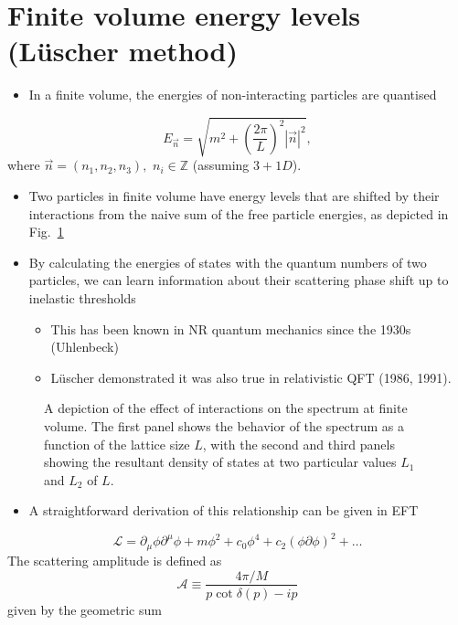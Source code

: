 \section{Finite volume energy levels (Lüscher method)}
\begin{itemize}
    \item In a finite volume, the energies of non-interacting particles are quantised
\end{itemize}
\begin{equation}
    E_{\vec{n}} = \sqrt{m^2 + \left(\frac{2 \pi}{L}\right)^2|\vec{n}|^2},
\end{equation}
where $\vec{n} = (n_1, n_2, n_3),$ $n_i \in \mathbb{Z}$ (assuming $3+1D$).
\begin{itemize}
    \item Two particles in finite volume have energy levels that are shifted by their interactions from the naive sum of the free particle energies, as depicted in Fig.~\ref{fig:int_spec}
    \item By calculating the energies of states with the quantum numbers of two particles, we can learn information about their scattering phase shift up to inelastic thresholds
    \begin{itemize}
        \item This has been known in NR quantum mechanics since the 1930s (Uhlenbeck)
        \item L\"uscher demonstrated it was also true in relativistic QFT (1986, 1991).
    \end{itemize}
\end{itemize}
\begin{figure}
\begin{subfigure}{0.3\textwidth}
\end{subfigure}
\begin{subfigure}{0.3\textwidth}
\end{subfigure}
\begin{subfigure}{0.3\textwidth}
\end{subfigure}
\caption{A depiction of the effect of interactions on the spectrum at finite volume. The first panel shows the behavior of the spectrum as a function of the lattice size $L$, with the second and third panels showing the resultant density of states at two particular values $L_1$ and $L_2$ of $L$.}
\label{fig:int_spec}
\end{figure}
\begin{itemize}
    \item A straightforward derivation of this relationship can be given in EFT
\end{itemize}
\begin{equation}
    \mathcal{L} = \partial_\mu \phi \partial^\mu \phi + m \phi^2 + c_0 \phi^4 + c_2(\phi \partial \phi)^2 + \ldots
\end{equation}
The scattering amplitude is defined as
\begin{equation}
    \mathcal{A} \equiv \frac{4 \pi / M}{p \cot \delta(p) - i p}
\end{equation}
given by the geometric sum


